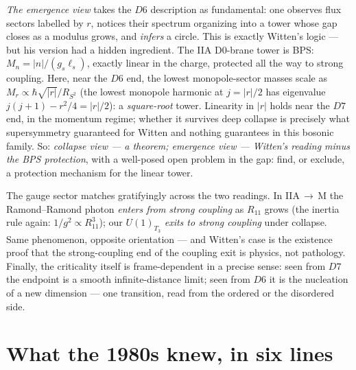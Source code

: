\documentclass[11pt]{article}
\newcommand{\hb}{\hbar}
\begin{document}
\emph{The emergence view} takes the $D6$ description as fundamental: one observes flux
sectors labelled by $r$, notices their spectrum organizing into a tower whose gap closes as
a modulus grows, and \emph{infers} a circle. This is exactly Witten's logic --- but his
version had a hidden ingredient. The IIA D0-brane tower is BPS: $M_n = |n|/(g_s\ell_s)$,
exactly linear in the charge, protected all the way to strong coupling. Here, near the $D6$
end, the lowest monopole-sector masses scale as $M_r\propto \hb\sqrt{|r|}/R_{S^2}$ (the
lowest monopole harmonic at $j=|r|/2$ has eigenvalue $j(j+1)-r^2/4 = |r|/2$): a
\emph{square-root} tower. Linearity in $|r|$ holds near the $D7$ end, in the momentum
regime; whether it survives deep collapse is precisely what supersymmetry guaranteed for
Witten and nothing guarantees in this bosonic family. So: \emph{collapse view --- a theorem;
emergence view --- Witten's reading minus the BPS protection}, with a well-posed open
problem in the gap: find, or exclude, a protection mechanism for the linear tower.

The gauge sector matches gratifyingly across the two readings. In IIA$\,\to\,$M the
Ramond--Ramond photon \emph{enters from strong coupling} as $R_{11}$ grows (the inertia rule
again: $1/g^2\propto R_{11}^3$); our $U(1)_{T_3}$ \emph{exits to strong coupling} under
collapse. Same phenomenon, opposite orientation --- and Witten's case is the existence proof
that the strong-coupling end of the coupling exit is physics, not pathology. Finally, the
criticality itself is frame-dependent in a precise sense: seen from $D7$ the endpoint is a
smooth infinite-distance limit; seen from $D6$ it is the nucleation of a new dimension ---
one transition, read from the ordered or the disordered side.

\section{What the 1980s knew, in six lines}
\end{document}
